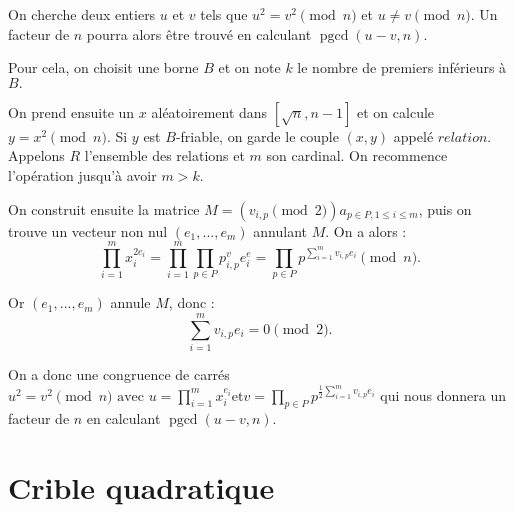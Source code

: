 \documentclass[french, 12pt, titlepage]{article}
\DeclareMathOperator{\pgcd}{pgcd}
\begin{document}
On cherche deux entiers $u$ et $v$ tels que $u^2 = v^2 \pmod n$ et $u
\neq v \pmod n$. Un facteur de $n$ pourra alors être trouvé en calculant
$\pgcd(u  - v, n).$

Pour cela, on choisit une borne $B$ et on note $k$ le nombre de
premiers inférieurs à $B.$ 

On prend ensuite un $x$ aléatoirement dans $[\sqrt{n}, n - 1]$ et
on calcule $y = x^2 \pmod n.$ Si $y$ est $B$-friable, on garde le
couple $(x, y)$ appelé $relation.$ Appelons $R$ l'ensemble des
relations et $m$ son cardinal. On recommence l'opération jusqu'à
avoir $m > k.$

On construit ensuite la matrice $M = (v_{i, p} \pmod 2)a_{p \in P, 1
  \leq i \leq m}$, puis on trouve un vecteur non nul $(e_1, ..., e_m)$
annulant $M.$
On a alors : \[\prod\limits_{i=1}^m x_i^{2e_i} = \prod\limits_{i=1}^m
\prod\limits_{p \in P} p^v_{i, p}e^e_i = \prod\limits_{p \in P}
p^{\sum\limits_{i=1}^m v_{i, p}e_i} \pmod n.\]

Or $(e_1, ..., e_m)$ annule $M$, donc : \[\sum\limits_{i=1}^m v_{i,
  p}e_i = 0 \pmod 2.\]

On a donc une congruence de carrés $u^2 = v^2 \pmod n \text{ avec } u =
\prod\limits_{i=1}^m x_i^{e_i} \text{et} v = \prod\limits_{p \in P}
p^{\frac{1}{2} \sum\limits_{i=1}^m v_{i, p}e_i}$ qui nous donnera un facteur
de $n$ en calculant $\pgcd(u - v, n).$


\section{Crible quadratique}
\end{document}
